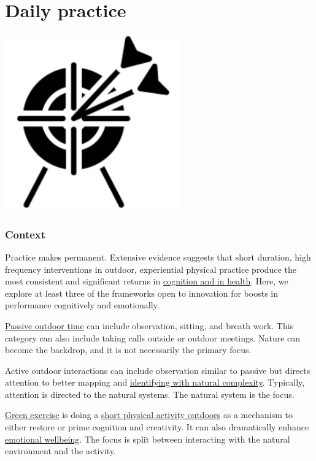 \documentclass[
]{book}
\begin{document}
\hypertarget{practice}{%
\chapter{Daily practice}\label{practice}}

\includegraphics[width=3in,height=\textheight]{./practice.png}

\hypertarget{context-2}{%
\subsection*{Context}\label{context-2}}

Practice makes permanent. Extensive evidence suggests that short duration, high frequency interventions in outdoor, experiential physical practice produce the most consistent and significant returns in \href{https://www.tandfonline.com/doi/full/10.1080/02640414.2020.1794763}{cognition and in health}. Here, we explore at least three of the frameworks open to innovation for boosts in performance cognitively and emotionally.

\href{https://www.nature.com/articles/s41598-019-44097-3}{Passive outdoor time} can include observation, sitting, and breath work. This category can also include taking calls outside or outdoor meetings. Nature can become the backdrop, and it is not necessarily the primary focus.

Active outdoor interactions can include observation similar to passive but directs attention to better mapping and \href{https://ellisonchair.tamu.edu/health-and-well-being-benefits-of-plants/}{identifying with natural complexity}. Typically, attention is directed to the natural systems. The natural system is the focus.

\href{https://www.tandfonline.com/doi/abs/10.1080/09603120500155963}{Green exercise} is doing a \href{https://pubmed.ncbi.nlm.nih.gov/22480735/}{short physical activity outdoors} as a mechanism to either restore or prime cognition and creativity. It can also dramatically enhance \href{https://www.mdpi.com/1660-4601/16/6/937}{emotional wellbeing}. The focus is split between interacting with the natural environment and the activity.
\end{document}
